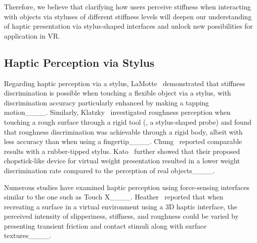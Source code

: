 Therefore, we believe that clarifying how users perceive stiffness when interacting with objects via styluses of different stiffness levels will deepen our understanding of haptic presentation via stylus-shaped interfaces and unlock new possibilities for application in VR.

\subsection{Haptic Perception via Stylus}
\label{2_2}

Regarding haptic perception via a stylus, LaMotte \etal\ demonstrated that stiffness discrimination is possible when touching a flexible object via a stylus, with discrimination accuracy particularly enhanced by making a tapping motion____. 
Similarly, Klatzky \etal\ investigated roughness perception when touching a rough surface through a rigid tool (\eg, a stylus-shaped probe) and found that roughness discrimination was achievable through a rigid body, albeit with less accuracy than when using a fingertip____. 
Chung \etal\ reported comparable results with a rubber-tipped stylus. 
Kato \etal\ further showed that their proposed chopstick-like device for virtual weight presentation resulted in a lower weight discrimination rate compared to the perception of real objects____.

Numerous studies have examined haptic perception using force-sensing interfaces similar to the one such as Touch X____.
Heather \etal\ reported that when recreating a surface in a virtual environment using a 3D haptic interface, the perceived intensity of slipperiness, stiffness, and roughness could be varied by presenting transient friction and contact stimuli along with surface textures____.

